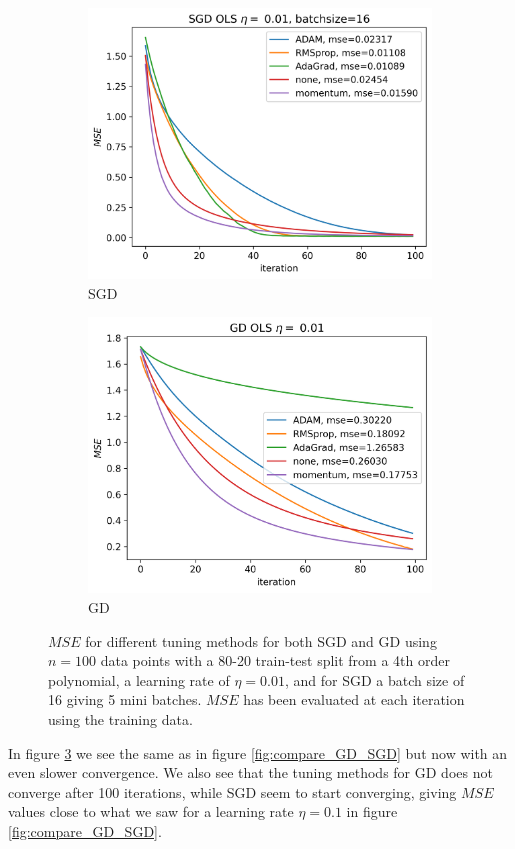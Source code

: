 \documentclass[11pt]{article}
\begin{document}
\begin{figure}[H]
    \begin{subfigure}{.5\textwidth}
        \centering
        \includegraphics[width=\textwidth]{../figures/SGD_methods_OLS_eta_0.01.png}
        \caption{SGD}
        \label{fig:}
    \end{subfigure}
    \begin{subfigure}{.5\textwidth}
        \centering
        \includegraphics[width=\textwidth]{../figures/GD_methods_OLS_eta_0.01.png}
        \caption{GD}
        \label{fig:}
    \end{subfigure}
    \caption{$MSE$ for different tuning methods for both SGD and GD using $n=100$ data points with a 80-20 train-test split from a 4th order polynomial, a learning rate of $\eta=0.01$, and for SGD a batch size of 16 giving 5 mini batches. $MSE$ has been evaluated at each iteration using the training data.}
    \label{fig:compare_GD_SGD_2}
\end{figure}
In figure \ref{fig:compare_GD_SGD_2} we see the same as in figure \ref{fig:compare_GD_SGD} but now with an even slower convergence. We also see that the tuning methods for GD does not converge after 100 iterations, while SGD seem to start converging, giving $MSE$ values close to what we saw for a learning rate $\eta =0.1$ in figure \ref{fig:compare_GD_SGD}.
\end{document}
